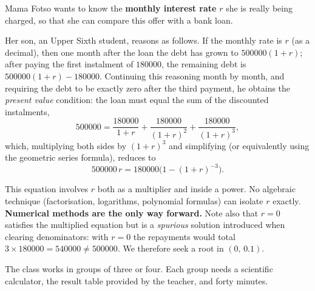 \documentclass[11pt]{article}
\newcounter{popsec}
\newcounter{popsub}
\newcommand{\courssub}[1]{%
  \stepcounter{popsub}%
  \par\vspace{9pt}\noindent{\popxbold\fontsize{11.5}{13}\selectfont\color{popink}{\color{poporange}\thepopsec.\thepopsub}\hspace{6pt}#1}\par\nopagebreak\vspace{4pt}
}
\begin{document}
Mama Fotso wants to know the \textbf{monthly interest rate} $r$ she is really being charged, so that she can compare this offer with a bank loan.

Her son, an Upper Sixth student, reasons as follows. If the monthly rate is $r$ (as a decimal), then one month after the loan the debt has grown to $500000(1+r)$; after paying the first instalment of $180000$, the remaining debt is $500000(1+r)-180000$. Continuing this reasoning month by month, and requiring the debt to be exactly zero after the third payment, he obtains the \emph{present value} condition: the loan must equal the sum of the discounted instalments,
\[
500000=\frac{180000}{1+r}+\frac{180000}{(1+r)^{2}}+\frac{180000}{(1+r)^{3}},
\]
which, multiplying both sides by $(1+r)^{3}$ and simplifying (or equivalently using the geometric series formula), reduces to
\[
500000\,r=180000\bigl(1-(1+r)^{-3}\bigr).
\]

\begin{attention}
This equation involves $r$ both as a multiplier and inside a power. No algebraic technique (factorisation, logarithms, polynomial formulas) can isolate $r$ exactly. \textbf{Numerical methods are the only way forward.} Note also that $r=0$ satisfies the multiplied equation but is a \emph{spurious} solution introduced when clearing denominators: with $r=0$ the repayments would total $3\times180000=540000\neq 500000$. We therefore seek a root in $(0,\,0.1)$.
\end{attention}

The class works in groups of three or four. Each group needs a scientific calculator, the result table provided by the teacher, and forty minutes.

\courssub{Tasks}
\end{document}

